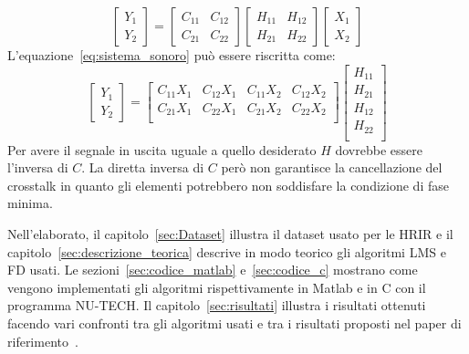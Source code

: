 \documentclass[12pt,a4paper,titlepage]{article}
\begin{document}
\begin{equation}\label{eq:sistema_sonoro}
\begin{bmatrix}
Y_1\\
Y_2
\end{bmatrix}
=
\begin{bmatrix}
C_{11} & C_{12}\\
C_{21} & C_{22}
\end{bmatrix}
\begin{bmatrix}
H_{11} & H_{12}\\
H_{21} & H_{22}
\end{bmatrix}
\begin{bmatrix}
X_1\\
X_2
\end{bmatrix}
\end{equation}
L'equazione~\eqref{eq:sistema_sonoro} può essere riscritta come:
\begin{equation}
\begin{bmatrix}
Y_1\\
Y_2
\end{bmatrix}
=
\begin{bmatrix}
C_{11} X_1 & C_{12} X_1 & C_{11} X_2 & C_{12} X_2 \\ 
C_{21} X_1 & C_{22} X_1 & C_{21} X_2 & C_{22} X_2 \\ 
\end{bmatrix}
\begin{bmatrix}
H_{11}\\
H_{21}\\
H_{12}\\
H_{22}\\
\end{bmatrix}
\end{equation}
Per avere il segnale in uscita uguale a quello desiderato $H$ dovrebbe essere l'inversa di $C$. La diretta inversa di $C$ però non garantisce la cancellazione del crosstalk in quanto gli elementi potrebbero non soddisfare la condizione di fase minima. 

Nell'elaborato, il capitolo~\ref{sec:Dataset} illustra il dataset usato per le HRIR e il capitolo~\ref{sec:descrizione_teorica} descrive in modo teorico gli algoritmi LMS e FD usati. Le sezioni~\ref{sec:codice_matlab} e~\ref{sec:codice_c} mostrano come vengono implementati gli algoritmi rispettivamente in Matlab e in C con il programma NU-TECH. Il capitolo~\ref{sec:risultati} illustra i risultati ottenuti facendo vari confronti tra gli algoritmi usati e tra i risultati proposti nel paper di riferimento~\cite{Li:comprehensive_comparison}.
\clearpage
\end{document}
